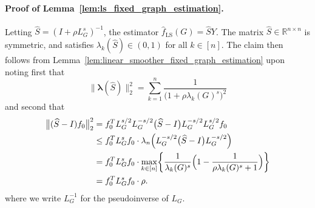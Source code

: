 \documentclass{article}
\newcommand{\Reals}{\mathbb{R}}
\newcommand{\1}{\mathbf{1}}
\newcommand{\lambdavec}{\boldsymbol{\lambda}}
\newcommand{\Lap}{L}
\newcommand{\Id}{I}
\newcommand{\wh}[1]{\widehat{#1}}
\newcommand{\LS}{\mathrm{LS}}
\theoremstyle{alden}
\theoremstyle{aldenthm}
\theoremstyle{definition}
\theoremstyle{remark}
\begin{document}
\paragraph{Proof of Lemma~\ref{lem:ls_fixed_graph_estimation}.}
Letting $\wh{S} = (\Id + \rho \Lap_G^s)^{-1}$, the estimator $\wh{f}_{\LS}(G) = \wh{S}Y$. The matrix $\wh{S} \in \Reals^{n \times n}$ is symmetric, and satisfies $\lambda_k(\wh{S}) \in (0,1)$ for all $k \in [n]$. The claim then follows from Lemma~\ref{lem:linear_smoother_fixed_graph_estimation} upon noting first that
\begin{equation*}
\bigl\|\lambdavec(\wh{S})\bigr\|_2^2 = \sum_{k = 1}^{n} \frac{1}{\bigl(1 + \rho \lambda_k(G)^s\bigr)^2}
\end{equation*} 
and second that
\begin{equation*}
\begin{aligned}
\bigl\|(\wh{S} - I)f_0\bigr\|_2^2 & = f_0^T \Lap_G^{s/2} \Lap_G^{-s/2}\bigl(\wh{S} - \Id\bigr) \Lap_G^{-s/2} \Lap_G^{s/2} f_0 \\
& \leq f_0^T \Lap_G^s f_0 \cdot \lambda_n\Bigl(\Lap_G^{-s/2}\bigl(\wh{S} - \Id\bigr)\Lap_G^{-s/2}\Bigr) \\
& = f_0^T \Lap_G^s f_0 \cdot \max_{k \in [n]} \biggl\{\frac{1}{\lambda_k(G)^s} \Bigl(1 - \frac{1}{\rho\lambda_k(G)^s + 1}\Bigr) \biggr\} \\
& = f_0^T \Lap_G^s f_0 \cdot \rho.
\end{aligned}
\end{equation*} 
where we write $\Lap_G^{-1}$ for the pseudoinverse of $\Lap_G$.
\end{document}
